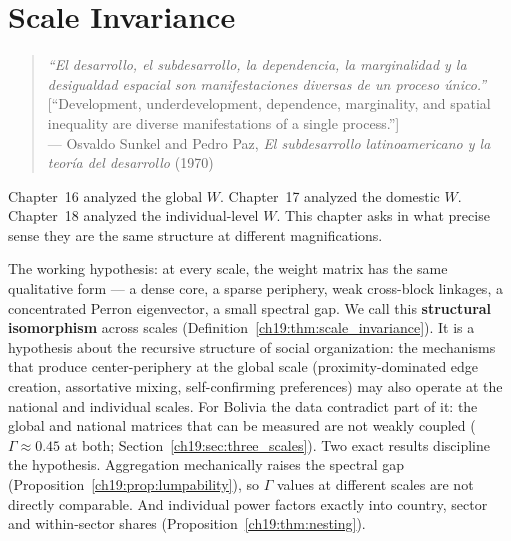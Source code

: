 \documentclass[../structural_economics_book.tex]{subfiles}
\begin{document}
\ifSubfilesClassLoaded{\setcounter{chapter}{18}}{}
\chapter{Scale Invariance}\label{ch:19}
\begin{quote}
\textit{``El desarrollo, el subdesarrollo, la dependencia, la marginalidad y la desigualdad espacial son manifestaciones diversas de un proceso \'{u}nico.''}\\[0.3em]
\textnormal{[``Development, underdevelopment, dependence, marginality, and spatial inequality are diverse manifestations of a single process.'']}\\
\hfill --- Osvaldo Sunkel and Pedro Paz, \textit{El subdesarrollo latinoamericano y la teor\'{i}a del desarrollo} (1970)
\end{quote}
\nocite{sunkel1970subdesarrollo}

\vspace{1em}

Chapter~16 analyzed the global $W$. Chapter~17 analyzed the domestic $W$. Chapter~18 analyzed the individual-level $W$. This chapter asks in what precise sense they are the same structure at different magnifications.

The working hypothesis: at every scale, the weight matrix has the same qualitative form --- a dense core, a sparse periphery, weak cross-block linkages, a concentrated Perron eigenvector, a small spectral gap. We call this \textbf{structural isomorphism} across scales (Definition~\ref{ch19:thm:scale_invariance}). It is a hypothesis about the recursive structure of social organization: the mechanisms that produce center-periphery at the global scale (proximity-dominated edge creation, assortative mixing, self-confirming preferences) may also operate at the national and individual scales. For Bolivia the data contradict part of it: the global and national matrices that can be measured are not weakly coupled ($\Gamma \approx 0.45$ at both; Section~\ref{ch19:sec:three_scales}). Two exact results discipline the hypothesis. Aggregation mechanically raises the spectral gap (Proposition~\ref{ch19:prop:lumpability}), so $\Gamma$ values at different scales are not directly comparable. And individual power factors exactly into country, sector and within-sector shares (Proposition~\ref{ch19:thm:nesting}).
\end{document}
